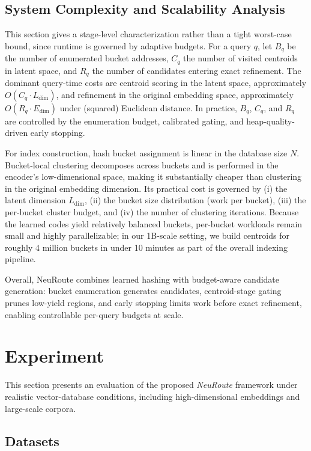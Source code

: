 \documentclass[sigconf, nonacm]{acmart}
\begin{document}
\subsection{System Complexity and Scalability Analysis}
This section gives a stage-level characterization rather than a tight worst-case bound, since runtime is governed by adaptive budgets.
For a query $q$, let $B_q$ be the number of enumerated bucket addresses, $C_q$ the number of visited centroids in latent space, and $R_q$ the number of candidates entering exact refinement.
The dominant query-time costs are centroid scoring in the latent space, approximately $O(C_q \cdot L_{\text{dim}})$, and refinement in the original embedding space, approximately $O(R_q \cdot E_{\text{dim}})$ under (squared) Euclidean distance.
In practice, $B_q$, $C_q$, and $R_q$ are controlled by the enumeration budget, calibrated gating, and heap-quality-driven early stopping.

For index construction, hash bucket assignment is linear in the database size $N$.
Bucket-local clustering decomposes across buckets and is performed in the encoder's low-dimensional space, making it substantially cheaper than clustering in the original embedding dimension.
Its practical cost is governed by (i) the latent dimension $L_{\text{dim}}$, (ii) the bucket size distribution (work per bucket), (iii) the per-bucket cluster budget, and (iv) the number of clustering iterations.
Because the learned codes yield relatively balanced buckets, per-bucket workloads remain small and highly parallelizable; in our 1B-scale setting, we build centroids for roughly 4 million buckets in under 10 minutes as part of the overall indexing pipeline.

Overall, NeuRoute combines learned hashing with budget-aware candidate generation: bucket enumeration generates candidates, centroid-stage gating prunes low-yield regions, and early stopping limits work before exact refinement, enabling controllable per-query budgets at scale.

\section{Experiment} 
\label{sec:experimental_analysis}

This section presents an evaluation of the proposed \textit{NeuRoute} framework under realistic vector-database conditions, including high-dimensional embeddings and large-scale corpora. 


\subsection{Datasets}
\label{sec:datasets}
\end{document}
